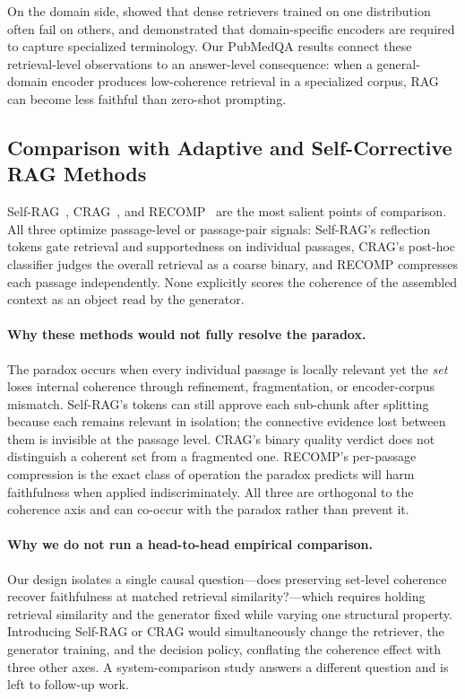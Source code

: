 On the domain side, \citet{thakur2021beir} showed that dense retrievers
trained on one distribution often fail on others, and
\citet{gu2024biomedical} demonstrated that domain-specific encoders are
required to capture specialized terminology. Our PubMedQA results connect
these retrieval-level observations to an answer-level consequence: when a
general-domain encoder produces low-coherence retrieval in a specialized
corpus, RAG can become less faithful than zero-shot prompting.

\subsection{Comparison with Adaptive and Self-Corrective RAG Methods}
\label{sec:baseline_compare}

Self-RAG~\citep{asai2024selfrag}, CRAG~\citep{yan2024crag}, and
RECOMP~\citep{xu2023recomp} are the most salient points of comparison.
All three optimize passage-level or passage-pair signals: Self-RAG's
reflection tokens gate retrieval and supportedness on individual
passages, CRAG's post-hoc classifier judges the overall retrieval as a
coarse binary, and RECOMP compresses each passage independently. None
explicitly scores the coherence of the assembled context as an object
read by the generator.

\paragraph{Why these methods would not fully resolve the paradox.}
The paradox occurs when every individual passage is locally relevant yet
the \emph{set} loses internal coherence through refinement, fragmentation,
or encoder-corpus mismatch. Self-RAG's tokens can still approve each
sub-chunk after splitting because each remains relevant in isolation; the
connective evidence lost between them is invisible at the passage level.
CRAG's binary quality verdict does not distinguish a coherent set from a
fragmented one. RECOMP's per-passage compression is the exact class of
operation the paradox predicts will harm faithfulness when applied
indiscriminately. All three are orthogonal to the coherence axis and can
co-occur with the paradox rather than prevent it.

\paragraph{Why we do not run a head-to-head empirical comparison.}
Our design isolates a single causal question---does preserving set-level
coherence recover faithfulness at matched retrieval similarity?---which
requires holding retrieval similarity and the generator fixed while
varying one structural property. Introducing Self-RAG or CRAG would
simultaneously change the retriever, the generator training, and the
decision policy, conflating the coherence effect with three other axes. A
system-comparison study answers a different question and is left to
follow-up work.

